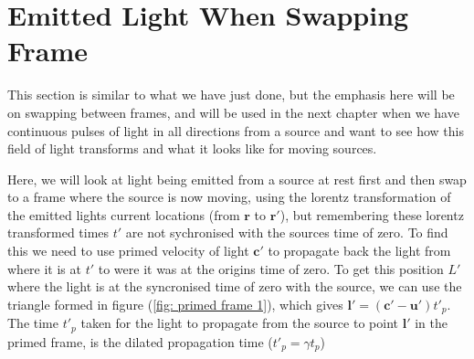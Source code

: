 \section{Emitted Light When Swapping Frame}\label{subsect: Emitted Light When Swapping Frame}

This section is similar to what we have just done, but the emphasis here will be on swapping between frames, and will be used in the next chapter when we have continuous pulses of light in all directions from a source and want to see how this field of light transforms and what it looks like for moving sources.

Here, we will look at light being emitted from a source at rest first and then swap to a frame where the source is now moving, using the lorentz transformation of the emitted lights current locations (from $\mathbf{r}$ to $\mathbf{r}{'}$), but remembering these lorentz transformed times $t'$ are not sychronised with the sources time of zero.
To find this we need to use primed velocity of light $\mathbf{c}{'}$ to propagate back the light from where it is at $t'$ to were it was at the origins time of zero.
To get this position $L'$ where the light is at the syncronised time of zero with the source, we can use the triangle formed in figure (\ref{fig: primed frame 1}), which gives $\mathbf{l}' = (\mathbf{c}' - \mathbf{u'}) t'_p$.
The time $t'_p$ taken for the light to propagate from the source to point $\mathbf{l}'$ in the primed frame, is the dilated propagation time ($t'_p = \gamma t_p$)

